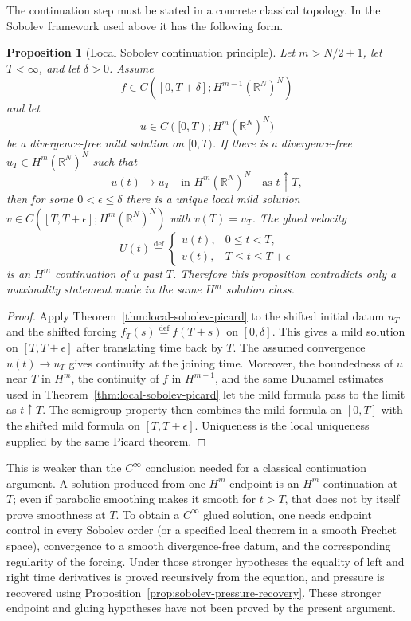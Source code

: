 \documentclass{amsart}
\newtheorem{prop}{Proposition}
\newcommand{\eqdef}{\overset{\mathrm{def}}{=}}
\begin{document}
The continuation step must be stated in a concrete classical topology.  In the
Sobolev framework used above it has the following form.

\begin{prop}[Local Sobolev continuation principle]
\label{prop:local-continuation-principle}
Let $m>N/2+1$, let $T<\infty$, and let $\delta>0$.  Assume
\[
  f\in C([0,T+\delta];H^{m-1}(\mathbb{R}^N)^N)
\]
and let
\[
  u\in C([0,T);H^m(\mathbb{R}^N)^N)
\]
be a divergence-free mild solution on $[0,T)$.  If there is a divergence-free
$u_T\in H^m(\mathbb{R}^N)^N$ such that
\[
  u(t)\to u_T\quad\text{in }H^m(\mathbb{R}^N)^N
  \quad\text{as }t\uparrow T,
\]
then for some $0<\epsilon\leq\delta$ there is a unique local mild solution
$v\in C([T,T+\epsilon];H^m(\mathbb{R}^N)^N)$ with $v(T)=u_T$.  The glued
velocity
\[
  U(t)\eqdef
  \begin{cases}
    u(t),&0\leq t<T,\\
    v(t),&T\leq t\leq T+\epsilon
  \end{cases}
\]
is an $H^m$ continuation of $u$ past $T$.  Therefore this proposition
contradicts only a maximality statement made in the same $H^m$ solution class.
\end{prop}

\begin{proof}
Apply Theorem~\ref{thm:local-sobolev-picard} to the shifted initial datum
$u_T$ and the shifted forcing $f_T(s)\eqdef f(T+s)$ on $[0,\delta]$.  This
gives a mild solution on $[T,T+\epsilon]$ after translating time back by $T$.
The assumed convergence $u(t)\to u_T$ gives continuity at the joining time.
Moreover, the boundedness of $u$ near $T$ in $H^m$, the continuity of $f$ in
$H^{m-1}$, and the same Duhamel estimates used in
Theorem~\ref{thm:local-sobolev-picard} let the mild formula pass to the limit
as $t\uparrow T$.  The semigroup property then combines the mild formula on
$[0,T]$ with the shifted mild formula on $[T,T+\epsilon]$.  Uniqueness is the
local uniqueness supplied by the same Picard theorem.
\end{proof}

This is weaker than the $C^\infty$ conclusion needed for a classical
continuation argument.  A solution produced from one $H^m$ endpoint is an
$H^m$ continuation at $T$; even if parabolic smoothing makes it smooth for
$t>T$, that does not by itself prove smoothness at $T$.  To obtain a
$C^\infty$ glued solution, one needs endpoint control in every Sobolev order
(or a specified local theorem in a smooth Frechet space), convergence to a
smooth divergence-free datum, and the corresponding regularity of the forcing.
Under those stronger hypotheses the equality of left and right time
derivatives is proved recursively from the equation, and pressure is recovered
using Proposition~\ref{prop:sobolev-pressure-recovery}.  These stronger
endpoint and gluing hypotheses have not been proved by the present argument.
\end{document}
